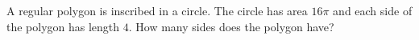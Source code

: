 A regular polygon is inscribed in a circle. The circle has area $16\pi$ and each side of the polygon has length $4$. How many sides does the polygon have?
